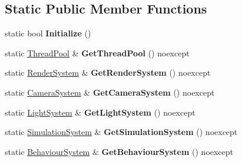 \subsection*{Static Public Member Functions}
\begin{DoxyCompactItemize}
\item 
\mbox{\label{class_blade_1_1_engine_context_a33f15f91dfa8e4c84de083c27ab98d86}} 
static bool {\bfseries Initialize} ()
\item 
\mbox{\label{class_blade_1_1_engine_context_a4ceab253aad2d1d0263f742f454e674c}} 
static \hyperlink{class_blade_1_1_thread_pool}{Thread\+Pool} \& {\bfseries Get\+Thread\+Pool} () noexcept
\item 
\mbox{\label{class_blade_1_1_engine_context_a9de91f1e7fcf28a5f5cf331852b60d91}} 
static \hyperlink{class_blade_1_1_render_system}{Render\+System} \& {\bfseries Get\+Render\+System} () noexcept
\item 
\mbox{\label{class_blade_1_1_engine_context_aaddcd3c7718c2feb60123886add4c7e4}} 
static \hyperlink{class_blade_1_1_camera_system}{Camera\+System} \& {\bfseries Get\+Camera\+System} () noexcept
\item 
\mbox{\label{class_blade_1_1_engine_context_a6e5facbcc140f77d56256099235cfb29}} 
static \hyperlink{class_blade_1_1_light_system}{Light\+System} \& {\bfseries Get\+Light\+System} () noexcept
\item 
\mbox{\label{class_blade_1_1_engine_context_a198c8461bd9afb1e50938066d694df16}} 
static \hyperlink{class_blade_1_1_simulation_system}{Simulation\+System} \& {\bfseries Get\+Simulation\+System} () noexcept
\item 
\mbox{\label{class_blade_1_1_engine_context_acb45de32a4850bcd083b9f16631c86a8}} 
static \hyperlink{class_blade_1_1_behaviour_system}{Behaviour\+System} \& {\bfseries Get\+Behaviour\+System} () noexcept
\item 
\mbox{\label{class_blade_1_1_engine_context_a1eeb49387ae175dacfbbc1c2bd84d68c}} 

\end{DoxyCompactItemize}
